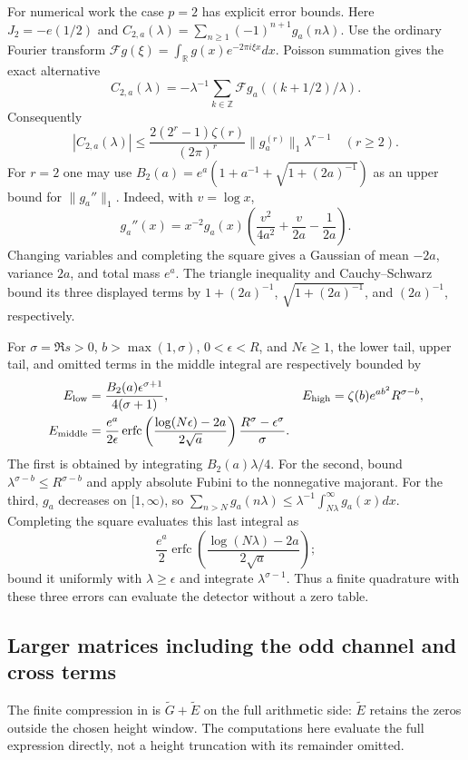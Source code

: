 For numerical work the case $p=2$ has explicit error bounds.
Here $J_2=-e(1/2)$ and $C_{2,a}(\lambda)=
\sum_{n\ge1}(-1)^{n+1}g_a(n\lambda)$.
Use the ordinary Fourier transform
$\mathcal Fg(\xi)=\int_\mathbb Rg(x)e^{-2\pi i\xi x}dx$.
Poisson summation gives the exact alternative
\[
 C_{2,a}(\lambda)=-\lambda^{-1}
   \sum_{k\in\mathbb Z}\mathcal Fg_a((k+1/2)/\lambda).
 \]
Consequently
\[
 |C_{2,a}(\lambda)|\le
 \frac{2(2^r-1)\zeta(r)}{(2\pi)^r}
 \|g_a^{(r)}\|_1\lambda^{r-1}\quad(r\ge2).
 \]
For $r=2$ one may use
$B_2(a)=e^a(1+a^{-1}+\sqrt{1+(2a)^{-1}})$ as an upper bound for
$\|g_a''\|_1$. Indeed, with $v=\log x$,
\[
 g_a''(x)=x^{-2}g_a(x)
  \left(\frac{v^2}{4a^2}+\frac{v}{2a}-\frac1{2a}\right).
 \]
Changing variables and completing the square gives a Gaussian of mean
$-2a$, variance $2a$, and total mass $e^a$. The triangle inequality
and Cauchy--Schwarz bound its three displayed terms by
$1+(2a)^{-1}$, $\sqrt{1+(2a)^{-1}}$, and $(2a)^{-1}$, respectively.

For $\sigma=\Re s>0$, $b>\max(1,\sigma)$, $0<\epsilon<R$, and
$N\epsilon\ge1$, the lower tail, upper tail, and omitted terms in the
middle integral are respectively bounded by
\begin{align}
 E_{\rm low}&=\frac{B_2(a)\epsilon^{\sigma+1}}{4(\sigma+1)},&
 E_{\rm high}&=\zeta(b)e^{ab^2}R^{\sigma-b},\notag\\
 E_{\rm middle}&=\frac{e^a}{2\epsilon}
 \operatorname{erfc}\left(\frac{\log(N\epsilon)-2a}{2\sqrt a}\right)
 \frac{R^\sigma-\epsilon^\sigma}{\sigma}.
 \label{eq:rh-gaussian-errors}
\end{align}
The first is obtained by integrating $B_2(a)\lambda/4$.
For the second, bound $\lambda^{\sigma-b}\le R^{\sigma-b}$ and apply
absolute Fubini to the nonnegative majorant.
For the third, $g_a$ decreases on $[1,\infty)$, so
$\sum_{n>N}g_a(n\lambda)\le\lambda^{-1}\int_{N\lambda}^\infty g_a(x)dx$.
Completing the square evaluates this last integral as
\[
 \frac{e^a}{2}
 \operatorname{erfc}\left(\frac{\log(N\lambda)-2a}{2\sqrt a}\right);
\]
bound it uniformly with $\lambda\ge\epsilon$ and integrate
$\lambda^{\sigma-1}$. Thus a finite quadrature with these three errors
can evaluate the detector without a zero table.

\subsection{Larger matrices including the odd channel and cross terms}

The finite compression in \cite[\S2.3]{alpogeFurman2026} is
$\widetilde G+\widetilde E$ on the full arithmetic side:
$\widetilde E$ retains the zeros outside the chosen height window.
The computations here evaluate the full expression directly, not a
height truncation with its remainder omitted.

